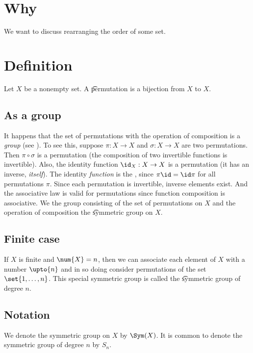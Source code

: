 

\section*{Why}

We want to discuss rearranging the order of some set.

\section*{Definition}

Let $X$ be a nonempty set.
A \t{permutation} is a bijection from $X$ to $X$.

\subsection*{As a group}

It happens that the set of permutations with the operation of composition is a \textit{group} (see ).
To see this, suppose $\pi : X \to X$ and $\sigma : X \to X$ are two permutations.
Then $\pi  \circ \sigma $ is a permutation (the composition of two invertible functions is invertible).
Also, the identity function $\id_{X}: X \to X$ is a permutation (it has an inverse, \textit{itself}).
The identity \textit{function} is the , since $\pi \id = \id\pi $ for all permutations $\pi $.
Since each permutation is invertible, inverse elements exist.
And the associative law is valid for permutations since function composition is associative.
We the group consisting of the set of permutations on $X$ and the operation of composition the \t{symmetric group on $X$}.

\subsection*{Finite case}

If $X$ is finite and $\num{X} = n$, then we can associate each element of $X$ with a number $\upto{n}$ and in so doing consider permutations of the set $\set{1, \dots , n}$.
This special symmetric group is called the \t{symmetric group of degree $n$}.

\subsection*{Notation}

We denote the symmetric group on $X$ by $\Sym(X)$.
It is common to denote the symmetric group of degree $n$ by $S_n$.

\blankpage
